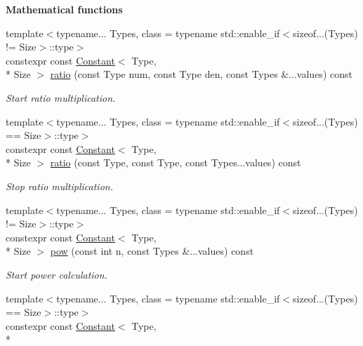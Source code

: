 \begin{Indent}{\bf Mathematical functions}\par
\begin{DoxyCompactItemize}
\item 
{\footnotesize template$<$typename... Types, class  = typename std\-::enable\-\_\-if$<$sizeof...(\-Types) != Size$>$\-::type$>$ }\\constexpr const \hyperlink{exceptionmagrathea_1_1Constant}{Constant}$<$ Type, \\*
Size $>$ \hyperlink{exceptionmagrathea_1_1Constant_ae9176bf852a3b1de4e63cf58e2d45ec3}{ratio} (const Type num, const Type den, const Types \&...values) const 
\begin{DoxyCompactList}\small\item\em Start ratio multiplication. \end{DoxyCompactList}\item 
{\footnotesize template$<$typename... Types, class  = typename std\-::enable\-\_\-if$<$sizeof...(\-Types) == Size$>$\-::type$>$ }\\constexpr const \hyperlink{exceptionmagrathea_1_1Constant}{Constant}$<$ Type, \\*
Size $>$ \hyperlink{exceptionmagrathea_1_1Constant_a61408aedabbe82055606b2955e9a5511}{ratio} (const Type, const Type, const Types...\-values) const 
\begin{DoxyCompactList}\small\item\em Stop ratio multiplication. \end{DoxyCompactList}\item 
{\footnotesize template$<$typename... Types, class  = typename std\-::enable\-\_\-if$<$sizeof...(\-Types) != Size$>$\-::type$>$ }\\constexpr const \hyperlink{exceptionmagrathea_1_1Constant}{Constant}$<$ Type, \\*
Size $>$ \hyperlink{exceptionmagrathea_1_1Constant_af53153132d81a7d362a8698b254f2439}{pow} (const int n, const Types \&...values) const 
\begin{DoxyCompactList}\small\item\em Start power calculation. \end{DoxyCompactList}\item 
{\footnotesize template$<$typename... Types, class  = typename std\-::enable\-\_\-if$<$sizeof...(\-Types) == Size$>$\-::type$>$ }\\constexpr const \hyperlink{exceptionmagrathea_1_1Constant}{Constant}$<$ Type, \\*

\end{DoxyCompactItemize}
\end{Indent}
